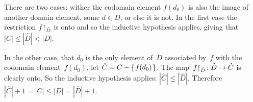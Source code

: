 \documentclass{ibl}  %
\begin{document}
\begin{problem}
\begin{exes}
\begin{answer}
  There are two cases:
  wither the codomain element $f(d_0)$ is also the image of another domain
  element, some $d\in\hat{D}$, or else it is not.
  In the first case the restriction ${f}\mathord\upharpoonright_{\hat{D}}$ is onto
  and so the inductive hypothesis applies, giving that 
  $|C|\leq |\hat{D}|<|D|$.

  In the other case, that $d_0$ is the only element of~$D$ associated 
  by~$f$ with the codomain element~$f(d_0)$, let $\hat{C}=C-\mbox{$\{\hspace{0.1em}f(d_0)\hspace{0.1em}\}$}$.
  The map~$\mbox{${f}\mathord\upharpoonright_{\hat{D}}\colon \hat{D}\to \hat{C}$}$ is clearly onto.
  So the inductive hypothesis applies: $|\hat{C}|\leq |\hat{D}|$.
  Therefore $|\hat{C}|+1=|C|\leq |D|=|\hat{D}|+1$.
\end{answer}
\end{exes}
\end{problem}
\end{document}
